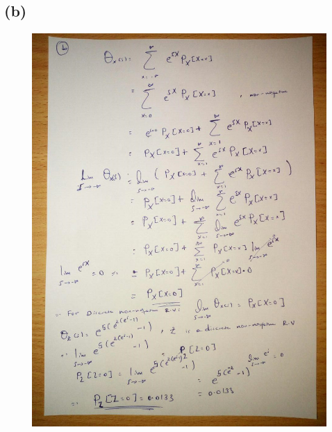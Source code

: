 \documentclass[a4paper,11pt]{article}
\begin{document}
\subsection*{(b)}
\begin{figure}[h]
\centering
   \includegraphics[scale=0.45]{q1_b}
\end{figure}
\clearpage
\newpage
\end{document}

